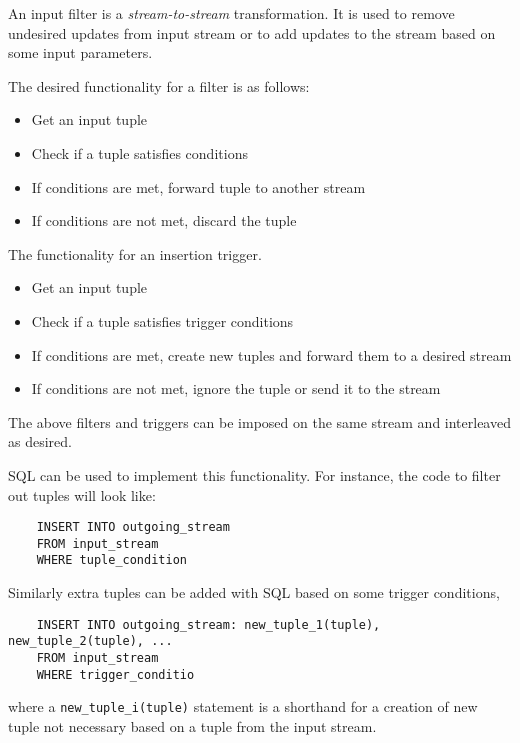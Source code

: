 \documentclass{article}
\begin{document}
An input filter is a \emph{stream-to-stream} transformation. It is used to remove undesired updates from input stream or to add updates to the stream based on some input parameters.

The desired functionality for a filter is as follows:

\begin{itemize}
    \item Get an input tuple
    \item Check if a tuple satisfies conditions
    \item If conditions are met, forward tuple to another stream
    \item If conditions are not met, discard the tuple
\end{itemize}

The functionality for an insertion trigger.

\begin{itemize}
    \item Get an input tuple
    \item Check if a tuple satisfies trigger conditions
    \item If conditions are met, create new tuples and forward them to a desired stream
    \item If conditions are not met, ignore the tuple or send it to the stream
\end{itemize}


\noindent The above filters and triggers can be imposed on the same stream and interleaved as desired.

SQL can be used to implement this functionality. For instance, the code to filter out tuples will look like:

\begin{verbatim}   
    INSERT INTO outgoing_stream
    FROM input_stream
    WHERE tuple_condition
\end{verbatim}

\noindent Similarly extra tuples can be added with SQL based on some trigger conditions,

\begin{verbatim}   
    INSERT INTO outgoing_stream: new_tuple_1(tuple), new_tuple_2(tuple), ...
    FROM input_stream
    WHERE trigger_conditio
\end{verbatim}

\noindent where a {\tt new\_tuple\_i(tuple)} statement is a shorthand for a creation of new tuple not necessary based on a tuple from the input stream.
\end{document}
